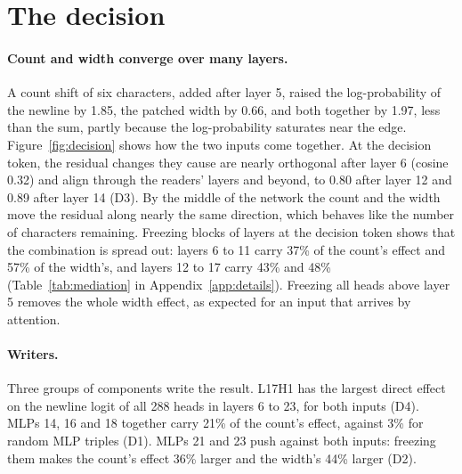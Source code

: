 \documentclass[11pt,a4paper]{article}
\begin{document}
\section{The decision}
\label{sec:decision}

\paragraph{Count and width converge over many layers.}
A count shift of six characters, added after layer 5, raised the log-probability of the newline by 1.85, the patched width by 0.66, and both together by 1.97, less than the sum, partly because the log-probability saturates near the edge. Figure~\ref{fig:decision} shows how the two inputs come together. At the decision token, the residual changes they cause are nearly orthogonal after layer 6 (cosine 0.32) and align through the readers' layers and beyond, to 0.80 after layer 12 and 0.89 after layer 14 (D3). By the middle of the network the count and the width move the residual along nearly the same direction, which behaves like the number of characters remaining. Freezing blocks of layers at the decision token shows that the combination is spread out: layers 6 to 11 carry 37\% of the count's effect and 57\% of the width's, and layers 12 to 17 carry 43\% and 48\% (Table~\ref{tab:mediation} in Appendix~\ref{app:details}). Freezing all heads above layer 5 removes the whole width effect, as expected for an input that arrives by attention.

\paragraph{Writers.}
Three groups of components write the result. L17H1 has the largest direct effect on the newline logit of all 288 heads in layers 6 to 23, for both inputs (D4). MLPs 14, 16 and 18 together carry 21\% of the count's effect, against 3\% for random MLP triples (D1). MLPs 21 and 23 push against both inputs: freezing them makes the count's effect 36\% larger and the width's 44\% larger (D2).
\end{document}
